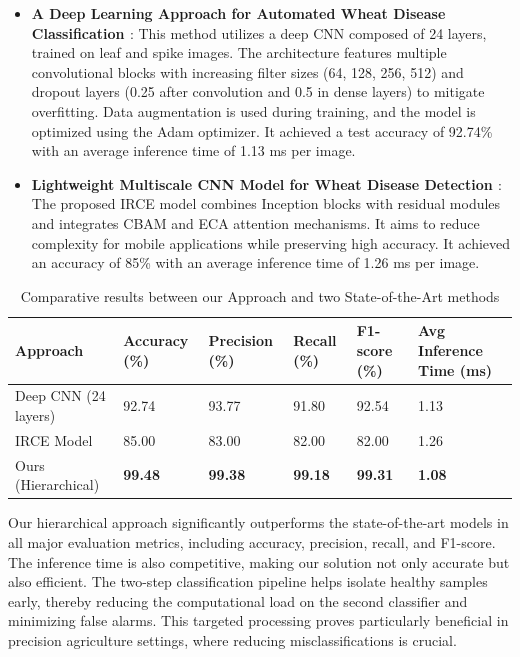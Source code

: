 \begin{itemize}
    \item \textbf{A Deep Learning Approach for Automated Wheat Disease Classification \parencite{oyal2021leaf}}: This method utilizes a deep CNN composed of 24 layers, trained on leaf and spike images. The architecture features multiple convolutional blocks with increasing filter sizes (64, 128, 256, 512) and dropout layers (0.25 after convolution and 0.5 in dense layers) to mitigate overfitting. Data augmentation is used during training, and the model is optimized using the Adam optimizer. It achieved a test accuracy of 92.74\% with an average inference time of 1.13 ms per image.

    \item \textbf{Lightweight Multiscale CNN Model for Wheat Disease Detection \parencite{fang2023lightweight}}: The proposed IRCE model combines Inception blocks with residual modules and integrates CBAM and ECA attention mechanisms. It aims to reduce complexity for mobile applications while preserving high accuracy. It achieved an accuracy of 85\% with an average inference time of 1.26 ms per image.
\end{itemize}    

\begin{table}[H]
\centering
\renewcommand{\arraystretch}{1.3}
\setlength{\tabcolsep}{6pt}
\caption{Comparative results between our Approach and two State-of-the-Art methods}
\begin{tabular}{|p{3cm}|p{2cm}|p{2cm}|p{2cm}|p{2cm}|p{2.5cm}|}
\hline
\textbf{Approach} & \textbf{Accuracy (\%)} & \textbf{Precision (\%)} & \textbf{Recall (\%)} & \textbf{F1-score (\%)} & \textbf{Avg Inference Time (ms)} \\
\hline
Deep CNN (24 layers) & 92.74 & 93.77 & 91.80 & 92.54 & 1.13 \\
\hline
IRCE Model & 85.00 & 83.00 & 82.00 & 82.00 & 1.26 \\
\hline
Ours (Hierarchical) & \textbf{99.48} & \textbf{99.38} & \textbf{99.18} & \textbf{99.31} & \textbf{1.08} \\
\hline
\end{tabular}
\label{tab:comparison_state_of_art}
\end{table}




Our hierarchical approach significantly outperforms the state-of-the-art models in all major evaluation metrics, including accuracy, precision, recall, and F1-score. The inference time is also competitive, making our solution not only accurate but also efficient. The two-step classification pipeline helps isolate healthy samples early, thereby reducing the computational load on the second classifier and minimizing false alarms. This targeted processing proves particularly beneficial in precision agriculture settings, where reducing misclassifications is crucial.

